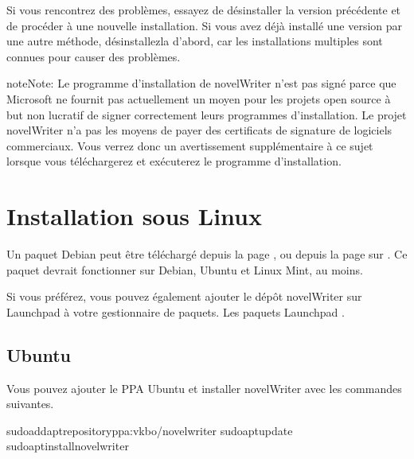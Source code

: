 \documentclass[a4paper,11pt,french]{sphinxmanual}
\begin{document}
\sphinxAtStartPar
Si vous rencontrez des problèmes, essayez de désinstaller la version précédente et de procéder à une nouvelle installation. Si vous avez déjà installé une version par une autre méthode, désinstallez\sphinxhyphen{}la d’abord, car les installations multiples sont connues pour causer des problèmes.

\begin{sphinxadmonition}{note}{Note:}
\sphinxAtStartPar
Le programme d’installation de novelWriter n’est pas signé parce que Microsoft ne fournit pas actuellement un moyen pour les projets open source à but non lucratif de signer correctement leurs programmes d’installation. Le projet novelWriter n’a pas les moyens de payer des certificats de signature de logiciels commerciaux. Vous verrez donc un avertissement supplémentaire à ce sujet lorsque vous téléchargerez et exécuterez le programme d’installation.
\end{sphinxadmonition}


\section{Installation sous Linux}
\label{\detokenize{int_started:installing-on-linux}}\label{\detokenize{int_started:a-started-linux}}
\sphinxAtStartPar
Un paquet Debian peut être téléchargé depuis la page , ou depuis la page  sur . Ce paquet devrait fonctionner sur Debian, Ubuntu et Linux Mint, au moins.

\sphinxAtStartPar
Si vous préférez, vous pouvez également ajouter le dépôt novelWriter sur Launchpad à votre gestionnaire de paquets. Les paquets Launchpad .


\subsection{Ubuntu}
\label{\detokenize{int_started:ubuntu}}
\sphinxAtStartPar
Vous pouvez ajouter le PPA Ubuntu et installer novelWriter avec les commandes suivantes.

\begin{sphinxVerbatim}[commandchars=\\\{\}]
sudoadd\PYGZhy{}apt\PYGZhy{}repositoryppa:vkbo/novelwriter
sudoaptupdate
sudoaptinstallnovelwriter
\end{sphinxVerbatim}
\end{document}
